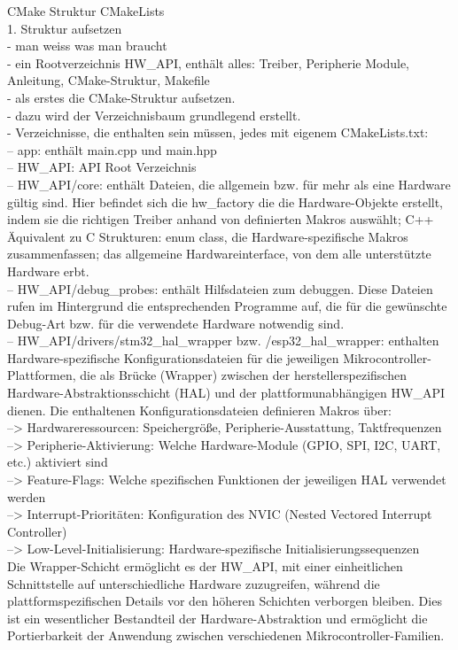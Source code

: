 CMake Struktur
CMakeLists
\\
1. Struktur aufsetzen\\
- man weiss was man braucht\\
- ein Rootverzeichnis HW\_API, enthält alles: Treiber, Peripherie Module, Anleitung, CMake-Struktur, Makefile\\
- als erstes die CMake-Struktur aufsetzen.\\
- dazu wird der Verzeichnisbaum  grundlegend erstellt.\\
- Verzeichnisse, die enthalten sein müssen, jedes mit eigenem CMakeLists.txt:\\
-- app: enthält main.cpp und main.hpp\\
-- HW\_API: API Root Verzeichnis\\
-- HW\_API/core: enthält Dateien, die allgemein bzw. für mehr als eine Hardware gültig sind. 
	Hier befindet sich die hw\_factory die die Hardware-Objekte erstellt, indem sie die richtigen Treiber anhand von definierten Makros auswählt; C++ Äquivalent zu C Strukturen: enum class, die Hardware-spezifische Makros zusammenfassen; das allgemeine Hardwareinterface, von dem alle unterstützte Hardware erbt.\\
-- HW\_API/debug\_probes: enthält Hilfsdateien zum debuggen. Diese Dateien rufen im Hintergrund die entsprechenden Programme auf, die für die gewünschte Debug-Art bzw. für die verwendete Hardware notwendig sind.\\
-- HW\_API/drivers/stm32\_hal\_wrapper bzw. /esp32\_hal\_wrapper: enthalten Hardware-spezifische Konfigurationsdateien für die jeweiligen Mikrocontroller-Plattformen, die als Brücke (Wrapper) zwischen der herstellerspezifischen Hardware-Abstraktionsschicht (HAL) und der plattformunabhängigen HW\_API dienen.
	Die enthaltenen Konfigurationsdateien definieren Makros über:\\
	--> Hardwareressourcen: Speichergröße, Peripherie-Ausstattung, Taktfrequenzen\\
	--> Peripherie-Aktivierung: Welche Hardware-Module (GPIO, SPI, I2C, UART, etc.) aktiviert sind\\
	--> Feature-Flags: Welche spezifischen Funktionen der jeweiligen HAL verwendet werden\\
	--> Interrupt-Prioritäten: Konfiguration des NVIC (Nested Vectored Interrupt Controller)\\
	--> Low-Level-Initialisierung: Hardware-spezifische Initialisierungssequenzen\\
	Die Wrapper-Schicht ermöglicht es der HW\_API, mit einer einheitlichen Schnittstelle auf unterschiedliche Hardware zuzugreifen, während die plattformspezifischen Details vor den höheren Schichten verborgen bleiben. Dies ist ein wesentlicher Bestandteil der Hardware-Abstraktion und ermöglicht die Portierbarkeit der Anwendung zwischen verschiedenen Mikrocontroller-Familien.
